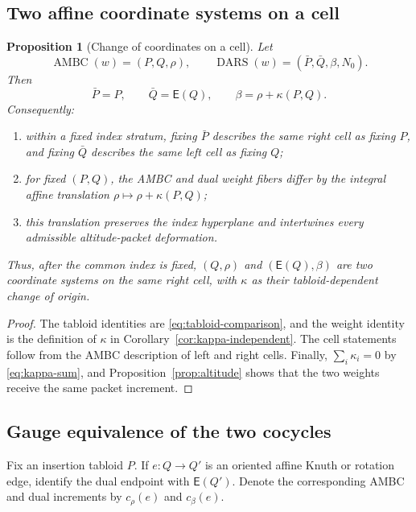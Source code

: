 \documentclass[11pt]{article}
\newtheorem{proposition}[theorem]{Proposition}
\theoremstyle{definition}
\theoremstyle{remark}
\newcommand{\RSd}{\operatorname{DARS}}
\newcommand{\AMBC}{\operatorname{AMBC}}
\newcommand{\E}{\mathsf E}
\begin{document}
\subsection{Two affine coordinate systems on a cell}

\begin{proposition}[Change of coordinates on a cell]\label{prop:cell-coordinates}
Let
\[
 \AMBC(w)=(P,Q,\rho),
 \qquad
 \RSd(w)=(\bar P,\bar Q,\beta,N_0).
\]
Then
\begin{equation}\label{eq:cell-coordinate-change}
 \bar P=P,\qquad \bar Q=\E(Q),\qquad
 \beta=\rho+\kappa(P,Q).
\end{equation}
Consequently:
\begin{enumerate}[label=(\roman*),leftmargin=2.2em]
\item within a fixed index stratum, fixing \(\bar P\) describes the same right cell as
fixing \(P\), and fixing \(\bar Q\) describes the same left cell as fixing \(Q\);
\item for fixed \((P,Q)\), the AMBC and dual weight fibers differ by the integral affine
translation \(\rho\mapsto\rho+\kappa(P,Q)\);
\item this translation preserves the index hyperplane and intertwines every admissible
altitude-packet deformation.
\end{enumerate}
Thus, after the common index is fixed, \((Q,\rho)\) and \((\E(Q),\beta)\) are two
coordinate systems on the same right cell, with \(\kappa\) as their
tabloid-dependent change of origin.
\end{proposition}

\begin{proof}
The tabloid identities are \eqref{eq:tabloid-comparison}, and the weight identity is the
definition of \(\kappa\) in Corollary~\ref{cor:kappa-independent}.  The cell statements
follow from the AMBC description of left and right cells.  Finally,
\(\sum_i\kappa_i=0\) by \eqref{eq:kappa-sum}, and Proposition~\ref{prop:altitude}
shows that the two weights receive the same packet increment.
\end{proof}

\subsection{Gauge equivalence of the two cocycles}

Fix an insertion tabloid \(P\).  If \(e:Q\to Q'\) is an oriented affine Knuth or
rotation edge, identify the dual endpoint with \(\E(Q')\).  Denote the corresponding
AMBC and dual increments by \(c_\rho(e)\) and \(c_\beta(e)\).
\end{document}
